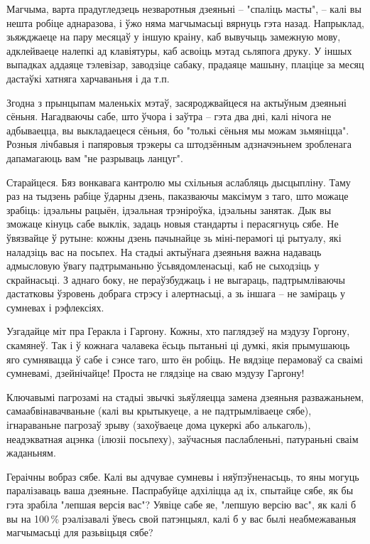 Магчыма, варта прадугледзець незваротныя дзеяньні – "спаліць масты", – калі вы нешта робіце аднаразова, і ўжо няма магчымасьці вярнуць гэта назад. Напрыклад, зьяжджаеце на пару месяцаў у іншую краіну, каб вывучыць замежную мову, адклейваеце налепкі ад клавіятуры, каб асвоіць мэтад сьляпога друку. У іншых выпадках аддаяце тэлевізар, заводзіце сабаку, прадаяце машыну, плаціце за месяц дастаўкі хатняга харчаваньня і да т.п.

Згодна з прынцыпам маленькіх мэтаў, засяроджвайцеся на актыўным дзеяньні сёньня. Нагадваючы сабе, што ўчора і заўтра – гэта два дні, калі нічога не адбываецца, вы выкладаецеся сёньня, бо "толькі сёньня мы можам зьмяніцца". Розныя лічбавыя і папяровыя трэкеры са штодзённым адзначэньнем зробленага дапамагаюць вам "не разрываць ланцуг".

Старайцеся. Бяз вонкавага кантролю мы схільныя аслабляць дысцыпліну. Таму раз на тыдзень рабіце ўдарны дзень, паказваючы максімум з таго, што можаце зрабіць: ідэальны рацыён, ідэальная трэніроўка, ідэальны занятак. Дык вы зможаце кінуць сабе выклік, задаць новыя стандарты і перасягнуць сябе. Не ўвязвайце ў рутыне: кожны дзень пачынайце зь міні-перамогі ці рытуалу, які наладзіць вас на посьпех. На стадыі актыўнага дзеяньня важна надаваць адмысловую ўвагу падтрыманьню ўсьвядомленасьці, каб не сыходзіць у скрайнасьці. З аднаго боку, не пераўзбуджаць і не выгараць, падтрымліваючы дастатковы ўзровень добрага стрэсу і алертнасьці, а зь іншага – не заміраць у сумневах і рэфлексіях.

Узгадайце міт пра Геракла і Гаргону. Кожны, хто паглядзеў на мэдузу Горгону, скамянеў. Так і ў кожнага чалавека ёсьць пытаньні ці думкі, якія прымушаюць яго сумнявацца ў сабе і сэнсе таго, што ён робіць. Не вядзіце перамоваў са сваімі сумневамі, дзейнічайце! Проста не глядзіце на сваю мэдузу Гаргону!

Ключавымі пагрозамі на стадыі звычкі зьяўляецца замена дзеяньня разважаньнем, самаабвінавачваньне (калі вы крытыкуеце, а не падтрымліваеце сябе), ігнараваньне пагрозаў зрыву (захоўваеце дома цукеркі або алькаголь), неадэкватная ацэнка (ілюзіі посьпеху), заўчасныя паслабленьні, патураньні сваім жаданьням.

Гераічны вобраз сябе. Калі вы адчувае сумневы і няўпэўненасьць, то яны могуць паралізаваць ваша дзеяньне. Паспрабуйце адхіліцца ад іх, спытайце сябе, як бы гэта зрабіла "лепшая версія вас"? Уявіце сабе яе, "лепшую версію вас", як калі б вы на 100\,\% рэалізавалі ўвесь свой патэнцыял, калі б у вас былі неабмежаваныя магчымасьці для разьвіцьця сябе?

